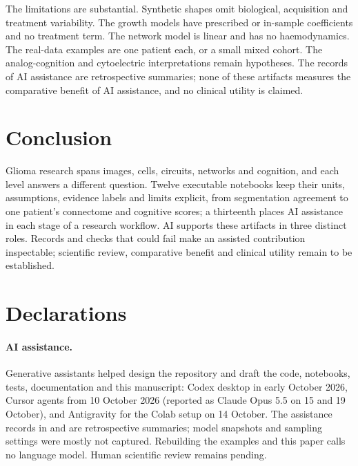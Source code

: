 \documentclass[11pt,a4paper]{article}
\begin{document}
The limitations are substantial. Synthetic shapes omit biological,
acquisition and treatment variability. The growth models have prescribed or
in-sample coefficients and no treatment term. The network model is linear
and has no haemodynamics. The real-data examples are one patient each, or a
small mixed cohort. The analog-cognition and cytoelectric interpretations
remain hypotheses. The records of AI assistance are retrospective summaries;
none of these artifacts measures the comparative benefit of AI assistance,
and no clinical utility is claimed.

\section{Conclusion}
Glioma research spans images, cells, circuits, networks and cognition, and
each level answers a different question. Twelve executable notebooks keep
their units, assumptions, evidence labels and limits explicit, from
segmentation agreement to one patient's connectome and cognitive scores; a
thirteenth places AI assistance in each stage of a research workflow. AI
supports these artifacts in three distinct roles. Records and checks that
could fail make an assisted contribution inspectable; scientific review,
comparative benefit and clinical utility remain to be established.

\section*{Declarations}

\paragraph{AI assistance.}
Generative assistants helped design the repository and draft the code,
notebooks, tests, documentation and this manuscript: Codex desktop in early
October 2026, Cursor agents from 10 October 2026 (reported as Claude Opus 5.5
on 15 and 19 October), and Antigravity for the Colab setup on 14 October. The
assistance records in  and  are
retrospective summaries; model snapshots and sampling settings were mostly
not captured. Rebuilding the examples and this paper calls no language model.
Human scientific review remains pending.
\end{document}
